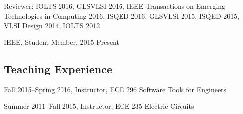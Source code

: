 \documentclass[letterpaper]{article}
\renewenvironment{itemize}{
  \begin{list}{}{
    \setlength{\leftmargin}{1.5em}
  }
}{
  \end{list}
}
\begin{document}
\begin{itemize}
	\item Reviewer: IOLTS 2016, GLSVLSI 2016,  IEEE Transactions on Emerging Technologies in Computing 2016, ISQED 2016, GLSVLSI 2015, ISQED 2015, VLSI Design 2014, IOLTS 2012
	\item IEEE, Student Member, 2015-Present
\end{itemize}

\subsection*{Teaching Experience}

\begin{itemize}
	\item Fall 2015--Spring 2016, Instructor, ECE 296 Software Tools for Engineers
	\item Summer 2011--Fall 2015, Instructor, ECE 235 Electric Circuits
\end{itemize}
\end{document}
